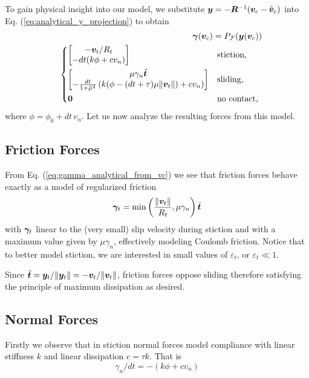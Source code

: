 To gain physical insight into our model, we
substitute ${\bm{y}}=-{\bm{R}}^{-1}({\bm{v}}_c - \hat{{\bm{v}}}_c)$ into Eq.
(\ref{eq:analytical_y_projection}) to obtain
\begin{eqnarray}
	&&\bgamma(\vf{v}_c) = P_\mathcal{F}(\vf{y}(\vf{v}_c))
    \label{eq:gamma_analytical_from_vc}\\
&&\begin{dcases}
	\begin{bmatrix}
		-\vf{v}_t/R_t\\
		-dt(k\phi + c v_n)
	\end{bmatrix}
	& \text{stiction, } \\
	\begin{bmatrix}
		\mu\gamma_n\hat{\vf{t}}\\
		-\frac{dt}{1+\tilde\mu^2}\left(k(\phi-(dt+\tau)\mu\Vert\vf{v}_t\Vert) + cv_n \right)
	\end{bmatrix}
	& \text{sliding, }\\
    \vf{0} & \text{no contact, }
\end{dcases}\nonumber	
\end{eqnarray}
where $\phi= \phi_0 + dt\,v_n$. Let us now analyze the resulting forces from
this model.

\subsection{Friction Forces}
From Eq. (\ref{eq:gamma_analytical_from_vc}) we see that friction forces behave exactly as a
model of regularized friction
\begin{equation}
	{\bm\gamma}_t = \min\left(\frac{\Vert{\bm{v}}_t\Vert}{R_t}, \mu\gamma_n\right)\hat{{\bm{t}}}
\end{equation}
with ${\bm\gamma}_t$ linear to the (very small) slip velocity during stiction and
with a maximum value given by $\mu\gamma_n$, effectively modeling Coulomb
friction. Notice that to better model stiction, we are interested in small
values of $\varepsilon_t$, or $\varepsilon_t\ll 1$.

Since $\hat{{\bm{t}}} = {\bm{y}}_t/\Vert{\bm{y}}_t\Vert =
-{\bm{v}}_t/\Vert{\bm{v}}_t\Vert$, friction forces oppose sliding therefore
satisfying the principle of maximum dissipation as desired.

\subsection{Normal Forces}
Firstly we observe that in stiction normal forces model compliance with linear
stiffness $k$ and linear dissipation $c = \tau k$. That is
\begin{equation}
    \gamma_n/dt = -(k\phi + c v_n)
\end{equation}

